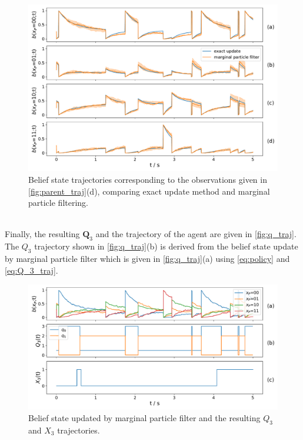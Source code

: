 \begin{figure}[t]
	\begin{center}
		\includegraphics[width=.9\textwidth]{figures/sim_example/belief_traj}
		\caption[Belief state trajectories]{Belief state trajectories corresponding to the observations given in \autoref{fig:parent_traj}(d), comparing exact update method and marginal particle filtering.}
		\label{fig:belief_traj}
	\end{center}
\end{figure}\\
Finally, the resulting $ \textbf{Q}_3 $ and the trajectory of the agent are given in \autoref{fig:q_traj}. The $ Q_3 $ trajectory shown in \autoref{fig:q_traj}(b) is derived from the belief state update by marginal particle filter which is given in \autoref{fig:q_traj}(a) using \autoref{eq:policy} and \autoref{eq:Q_3_traj}.
\begin{figure}[t]
	\begin{center}
		\includegraphics[width=.9\textwidth]{figures/sim_example/q_traj}
		\caption[$ Q_3 $ and $ X_3 $ trajectories]{Belief state updated by marginal particle filter and the resulting $ Q_3 $ and $ X_3 $ trajectories.}
		\label{fig:q_traj}
	\end{center}
\end{figure}\\
